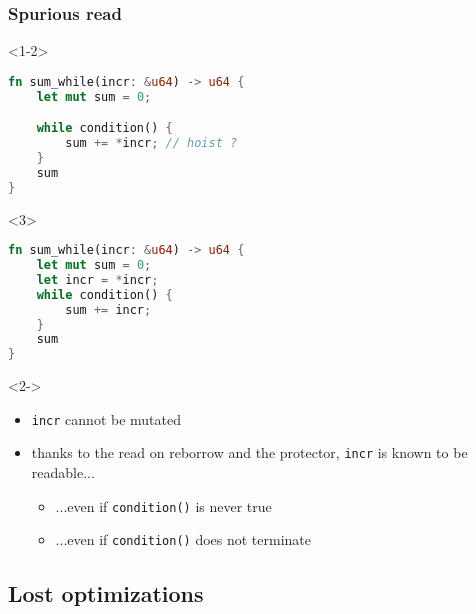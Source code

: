 \begin{frame}[fragile, t]
    \frametitle{{\cmark} Spurious read}
    \begin{onlyenv}<1-2>
        \begin{block}{}
            \begin{lstlisting}[language=rust]
fn sum_while(incr: &u64) -> u64 {
    let mut sum = 0;

    while condition() {
        sum += *incr; // hoist ?
    }
    sum
}
            \end{lstlisting}
        \end{block}
    \end{onlyenv}

    \begin{onlyenv}<3>
        \begin{block}{}
            \begin{lstlisting}[language=rust]
fn sum_while(incr: &u64) -> u64 {
    let mut sum = 0;
    let incr = *incr;
    while condition() {
        sum += incr;
    }
    sum
}
            \end{lstlisting}
        \end{block}
    \end{onlyenv}

    \begin{onlyenv}<2->
        \begin{block}{}
            \begin{itemize}
                \item \texttt{incr} cannot be mutated
                \item thanks to the read on reborrow and the protector, \texttt{incr} is known to be readable...
                    \begin{itemize}
                        \item ...even if \texttt{condition()} is never true
                        \item ...even if \texttt{condition()} does not terminate
                    \end{itemize}
            \end{itemize}
        \end{block}
    \end{onlyenv}
\end{frame}

\subsection{Lost optimizations}


